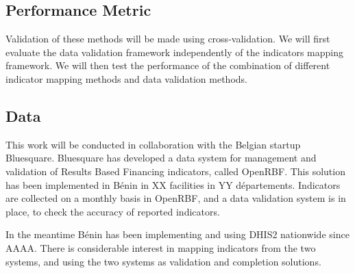 \subsection{Performance Metric}

Validation of these methods will be made using cross-validation. We will first evaluate the data validation framework independently of the indicators mapping framework. We will then test the performance of the combination of different indicator mapping methods and data validation methods.

\subsection{Data}

This work will be conducted in collaboration with the Belgian startup Bluesquare. Bluesquare has developed a data system for management and validation of Results Based Financing indicators, called OpenRBF. This solution has been implemented in Bénin in XX facilities in YY départements. Indicators are collected on a monthly basis in OpenRBF, and a data validation system is in place, to check the accuracy of reported indicators.

In the meantime Bénin has been implementing and using DHIS2 nationwide since AAAA. There is considerable interest in mapping indicators from the two systems, and using the two systems as validation and completion solutions.




